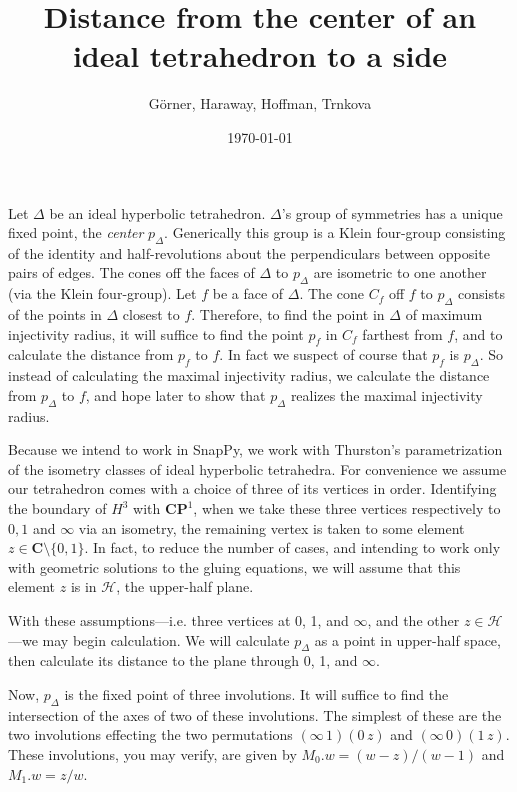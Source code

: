 \documentclass{amsart}
\theoremstyle{plain}
\begin{document}
\title{Distance from the center of an ideal tetrahedron to a side}
\author{G\"{o}rner, Haraway, Hoffman, Trnkova}
\date{\today}
\maketitle

Let $\Delta$ be an ideal hyperbolic tetrahedron.
$\Delta$'s group of symmetries has a
unique fixed point, the \emph{center} $p_\Delta$. Generically
this group is a Klein four-group consisting of the identity
and half-revolutions about the perpendiculars between
opposite pairs of edges. The cones off the faces of $\Delta$ to $p_\Delta$ are
isometric to one another (via the Klein four-group).
Let $f$ be a face of $\Delta$. The cone $C_f$ off $f$ to $p_\Delta$
consists of the points in $\Delta$ closest to $f$. Therefore,
to find the point in $\Delta$ of maximum injectivity radius,
it will suffice to find the point $p_f$ in $C_f$ farthest from $f$,
and to calculate the distance from $p_f$ to $f$. In fact we suspect
of course that $p_f$ is $p_\Delta$. So instead of calculating the
maximal injectivity radius, we calculate the distance from $p_\Delta$
to $f$, and hope later to show that $p_\Delta$ realizes the maximal
injectivity radius.

Because we intend to work in SnapPy, we work with Thurston's
parametrization of the isometry classes of ideal hyperbolic
tetrahedra. For convenience we assume our tetrahedron comes
with a choice of three of its vertices in order. Identifying
the boundary of $H^3$ with $\mathbf{CP}^1$, when we take
these three vertices respectively to $0,1$ and $\infty$ via
an isometry, the remaining vertex is taken to some element
$z \in \mathbf{C}\setminus\{0,1\}$. In fact, to reduce
the number of cases, and intending to work only with
geometric solutions to the gluing equations, we will assume
that this element $z$ is in $\mathcal{H}$, the upper-half plane.

With these assumptions---i.e. three vertices at 0, 1, and $\infty$,
and the other $z \in \mathcal{H}$---we may begin calculation.
We will calculate $p_\Delta$ as a point in upper-half space,
then calculate its distance to the plane through 0, 1, and $\infty$.

Now, $p_\Delta$ is the fixed point of three involutions.
It will suffice to find the intersection of the axes of
two of these involutions. The simplest of these are
the two involutions effecting the two permutations 
$(\infty\, 1)(0\, z)$ and $(\infty\, 0)(1\, z)$.
These involutions, you may verify, are given
by $M_0.w = (w-z)/(w-1)$ and $M_1.w = z/w$.
\end{document}
